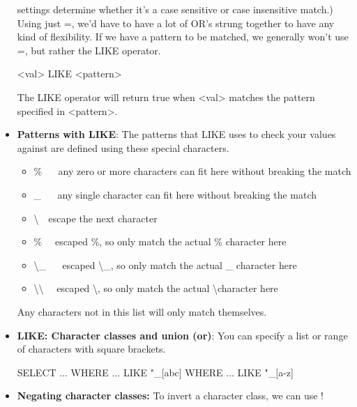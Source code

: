 \documentclass{report}
\begin{document}
\begin{itemize}
            settings determine whether it’s a case sensitive or case insensitive match.)
            \bigbreak \noindent 
            Using just =, we’d have to have a lot of OR’s strung together to have any kind of flexibility.
            \bigbreak \noindent 
            If we have a pattern to be matched, we generally won’t use =, but rather the LIKE operator.
            \bigbreak \noindent 
            \begin{sqlcode}
                <val> LIKE <pattern>
            \end{sqlcode}
            The LIKE operator will return true when <val> matches the pattern specified in <pattern>.
        \item \textbf{Patterns with LIKE}: The patterns that LIKE uses to check your values against are defined using these special characters. 
            \begin{itemize}
                \item \% $\quad$ any zero or more characters can fit here without breaking the match
                \item \_ $\quad$ any single character can fit here without breaking the match
                \item \textbackslash $\quad$escape the next character
                \item \% $\quad$escaped \%, so only match the actual \% character here
                \item \textbackslash\_ $\quad$ escaped \textbackslash\_, so only match the actual \_ character here
                \item \textbackslash\textbackslash $\quad $ escaped \textbackslash, so only match the actual \textbackslash character here
            \end{itemize}
            \bigbreak \noindent 
            Any characters not in this list will only match themselves.
            \bigbreak \noindent 
        \item \textbf{LIKE: Character classes and union (or)}: You can specify a list or range of characters with square brackets.
            \bigbreak \noindent 
            \begin{sqlcode}
            SELECT ...
                WHERE ... LIKE "_[abc]%
                WHERE ... LIKE "_[a-z]%
            \end{sqlcode}
        \item \textbf{Negating character classes:} To invert a character class, we can use !
            \bigbreak \noindent 
            \begin{sqlcode}

\end{sqlcode}
\end{itemize}
\end{document}
